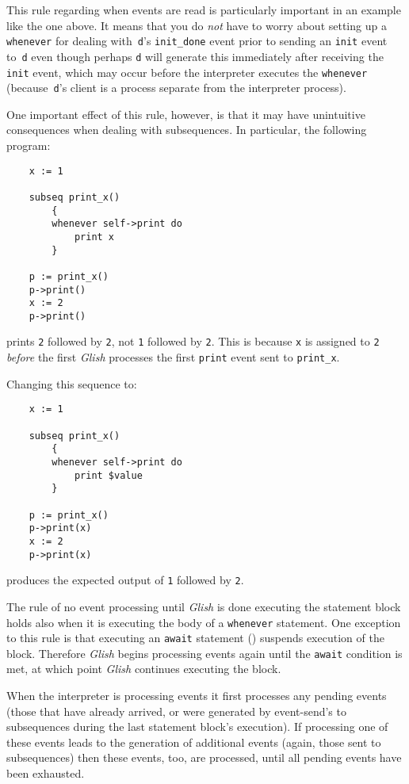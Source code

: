 \begin{sloppy}
This rule regarding when events are read is particularly important
in an example like the one above.  It means that you do {\em not}
have to worry about setting up a {\tt whenever} for dealing with~{\tt d}'s
{\tt init\_done} event prior to sending an {\tt init} event to~{\tt d}
even though perhaps {\tt d} will generate 
this immediately after
receiving the {\tt init} event, which may occur before the interpreter
executes the {\tt whenever} (because~{\tt d}'s client is a process
separate from the interpreter process).

One important effect of this rule, however, is that it may have
unintuitive consequences when dealing with subsequences.  In particular,
the following program:
\begin{verbatim}
    x := 1

    subseq print_x()
        {
        whenever self->print do
            print x
        }

    p := print_x()
    p->print()
    x := 2
    p->print()
\end{verbatim}
prints {\tt 2} followed by {\tt 2}, not {\tt 1} followed by {\tt 2}.
This is because {\tt x} is assigned to {\tt 2} {\em before} the
first {\em Glish} processes the first {\tt print} event sent to {\tt print\_x}.

Changing this sequence to:
\begin{verbatim}
    x := 1

    subseq print_x()
        {
        whenever self->print do
            print $value
        }

    p := print_x()
    p->print(x)
    x := 2
    p->print(x)
\end{verbatim}
produces the expected output of {\tt 1} followed by {\tt 2}.

The rule of no event processing until {\em Glish} is done executing the
statement block holds also when it is executing the body of a
{\tt whenever} statement.  One exception to this rule is that
executing an {\tt await} statement () suspends
execution of the block. Therefore {\em Glish} begins processing events again
until the {\tt await} condition is met, at which point {\em Glish} continues
executing the block.

When the interpreter is processing events it first processes any
pending events (those that have already arrived, or were generated
by event-send's to subsequences during the last statement block's
execution).  If processing one of these events leads to the generation
of additional events (again, those sent to subsequences) then these
events, too, are processed, until all pending events have been
exhausted.


\end{sloppy}
